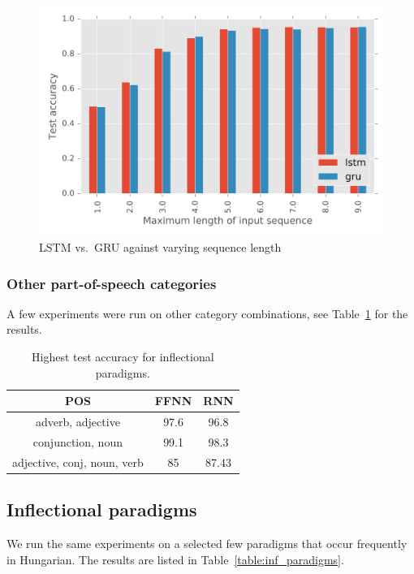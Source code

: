 \documentclass{article}
\begin{document}
\begin{figure}[h]
    \centering
    \label{fig:lstm_gru}
    \includegraphics[width=\textwidth]{lstm_gru}
      \caption{LSTM vs.~GRU against varying sequence length}
\end{figure}

\subsubsection{Other part-of-speech categories}

A few experiments were run on other category combinations, see Table~\ref{table:other_pos} for the results.
\begin{table}[t]
    \caption{Highest test accuracy for inflectional paradigms.}
    \label{table:other_pos}
    \centering
    \begin{tabular}{ccc}
        \toprule
        POS & FFNN & RNN \\
        \midrule
        adverb, adjective & 97.6 & 96.8 \\
        conjunction, noun & 99.1 & 98.3 \\
        adjective, conj, noun, verb & 85 & 87.43 \\
        \bottomrule
    \end{tabular}
\end{table}



\subsection{Inflectional paradigms}

We run the same experiments on a selected few paradigms that occur frequently in Hungarian.
The results are listed in Table~\ref{table:inf_paradigms}.
\end{document}
